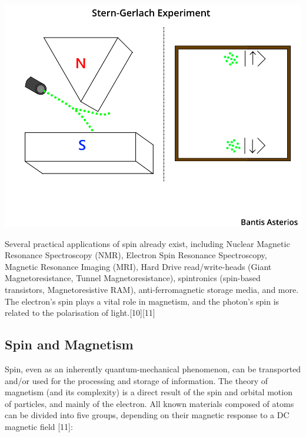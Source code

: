 \documentclass{article}
\begin{document}
\pagebreak

\begin{center}
    \includegraphics[scale=0.4]{sterngerl.png}
\end{center}

Several practical applications of spin already exist, including Nuclear Magnetic Resonance Spectroscopy (NMR), Electron Spin Resonance Spectroscopy, Magnetic Resonance Imaging (MRI), Hard Drive read/write-heads (Giant Magnetoresistance, Tunnel Magnetoresistance), spintronics (spin-based transistors, Magnetoresistive RAM), anti-ferromagnetic storage media, and more. The electron’s spin plays a vital role in magnetism, and the photon’s spin is related to the polarisation of light.[10][11]


\subsection{Spin and Magnetism}

Spin, even as an inherently quantum-mechanical phenomenon, can be transported and/or used for the processing and storage of information. The theory of magnetism (and its complexity) is a direct result of the spin and orbital motion of particles, and mainly of the electron. All known materials composed of atoms can be divided into five groups, depending on their magnetic response to a DC magnetic field [11]:
\end{document}

